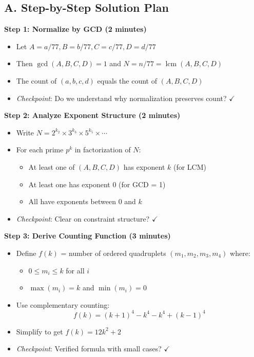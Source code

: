 \documentclass[11pt]{article}
\begin{document}
\begin{roadmapbox}
\subsection*{A. Step-by-Step Solution Plan}

\textbf{Step 1: Normalize by GCD (2 minutes)}
\begin{itemize}[leftmargin=*]
    \item Let $A = a/77, B = b/77, C = c/77, D = d/77$
    \item Then $\gcd(A,B,C,D) = 1$ and $N = n/77 = \operatorname{lcm}(A,B,C,D)$
    \item The count of $(a,b,c,d)$ equals the count of $(A,B,C,D)$
    \item \textit{Checkpoint}: Do we understand why normalization preserves count? $\checkmark$
\end{itemize}

\textbf{Step 2: Analyze Exponent Structure (2 minutes)}
\begin{itemize}[leftmargin=*]
    \item Write $N = 2^{k_2} \times 3^{k_3} \times 5^{k_5} \times \cdots$
    \item For each prime $p^k$ in factorization of $N$:
    \begin{itemize}
        \item At least one of $(A,B,C,D)$ has exponent $k$ (for LCM)
        \item At least one has exponent $0$ (for GCD = 1)
        \item All have exponents between $0$ and $k$
    \end{itemize}
    \item \textit{Checkpoint}: Clear on constraint structure? $\checkmark$
\end{itemize}

\textbf{Step 3: Derive Counting Function (3 minutes)}
\begin{itemize}[leftmargin=*]
    \item Define $f(k)$ = number of ordered quadruplets $(m_1,m_2,m_3,m_4)$ where:
    \begin{itemize}
        \item $0 \le m_i \le k$ for all $i$
        \item $\max(m_i) = k$ and $\min(m_i) = 0$
    \end{itemize}
    \item Use complementary counting:
    \[f(k) = (k+1)^4 - k^4 - k^4 + (k-1)^4\]
    \item Simplify to get $f(k) = 12k^2 + 2$
    \item \textit{Checkpoint}: Verified formula with small cases? $\checkmark$
\end{itemize}


\end{roadmapbox}
\end{document}
